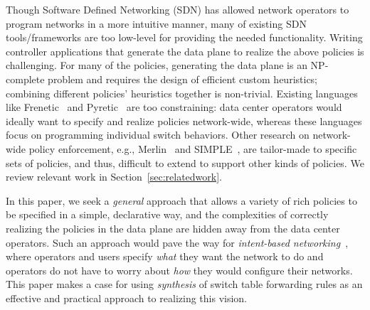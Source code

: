 Though Software Defined Networking (SDN) has allowed network operators
to program networks in a more intuitive manner, many of existing SDN
tools/frameworks are too low-level for providing the needed
functionality. Writing controller applications that generate the
data plane to realize the above policies is challenging. %
For many of the
  policies, generating the data plane is an NP-complete problem and
  requires the design of efficient custom heuristics; combining
  different policies' heuristics together is non-trivial. Existing
languages like Frenetic~\cite{frenetic} and Pyretic~\cite{pyretic} are
too constraining: data center operators would ideally want to specify
and realize policies network-wide, whereas these languages focus on
programming individual switch behaviors. %
Other research on network-wide policy enforcement, e.g.,
Merlin~\cite{Merlin} and SIMPLE~\cite{simple}, are tailor-made to
specific sets of policies, and thus, difficult to extend to support
other kinds of policies. We review relevant work in
Section~\ref{sec:relatedwork}.


In this paper, we seek a {\em general} approach that allows a variety
of rich policies to be specified in a simple, declarative way, and the
complexities of correctly realizing the policies in the data plane are
hidden away from the data center operators. Such an approach would
pave the way for {\em intent-based networking}~\cite{}, where
operators and users specify {\em what} they want the network to do and
operators do not have to worry about {\em how} they would configure
their networks. %
This paper makes a case for using \emph{synthesis} of switch table
forwarding rules as an effective and practical approach to realizing
this vision.

